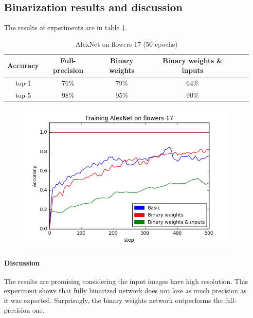 \documentclass[licencjacka]{pracamgr}
\begin{document}
		\subsection{Binarization results and discussion}
		        The results of experiments are in table \ref{table:1}.
		        \begin{table}[H]
				\caption{AlexNet on flowers-17 (50 epochs)}
                    \centering
                    \begin{tabular}{c c c c c c}
                    \hline\hline
			    Accuracy & Full-precision & Binary weights & Binary weights \& inputs \\ [0.5ex]
                    \hline
			    top-1 & 76\% & 79\% & 64\% \\
                    \hline
			    top-5 & 98\% & 95\% & 90\% \\
                    \hline
                    \end{tabular}
                    \label{table:1}
	            \end{table}
	            \begin{figure}[h]
				\centering
				\includegraphics[width=\textwidth]{images/AlexNet-flowers17}
			\end{figure}
	            
		        \paragraph{Discussion} 
                        The results are promising considering the input images have high resolution. This experiment shows that fully binarized network does not lose as much precision as it was expected. Surprisngly, the binary weights network outperforms the full-precision one.
\end{document}
